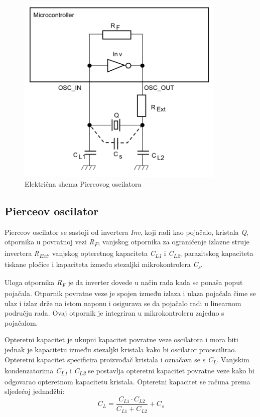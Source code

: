 \begin{figure}[hbt]
    \centering
    \includegraphics[width=10cm]{Figures/pierce.PNG}
    \caption{Električna shema Piercovog oscilatora \cite{stmicroelectronics:an2867}}
    \label{slk:PIERCE}
\end{figure}

\subsection{Pierceov oscilator}
Pierceov oscilator se sastoji od invertera \textit{Inv}, koji radi kao pojačalo, kristala \textit{Q}, otpornika u povratnoj vezi \textit{R\textsubscript{F}}, vanjskog otpornika za ograničenje izlazne struje invertera \textit{R\textsubscript{Ext}}, vanjskog opteretnog kapaciteta \textit{C\textsubscript{L1}} i \textit{C\textsubscript{L2}}, parazitskog kapaciteta tiskane pločice i kapaciteta između stezaljki mikrokontrolera \textit{C\textsubscript{s}}.

Uloga otpornika \textit{R\textsubscript{F}} je da inverter dovede u način rada kada se ponaša poput pojačala. Otpornik povratne veze je spojen između izlaza i ulaza pojačala čime se ulaz i izlaz drže na istom naponu i osigurava se da pojačalo radi u linearnom području rada. Ovaj otpornik je integriran u mikrokontroleru zajedno s pojačalom.

Opteretni kapacitet je ukupni kapacitet povratne veze oscilatora i mora biti jednak je kapacitetu između stezaljki kristala kako bi oscilator prooscilirao. Opteretni kapacitet specificira proizvođač kristala i označava se s \textit{C\textsubscript{L}}. Vanjskim kondenzatorima \textit{C\textsubscript{L1}} i \textit{C\textsubscript{L2}} se postavlja opteretni kapacitet povratne veze kako bi odgovarao opteretnom kapacitetu kristala. Opteretni kapacitet se računa prema sljedećoj jednadžbi:
\begin{equation} \label{eq:CLOAD}
    C_L=\frac{C_{L1}\cdot C_{L2}}{C_{L1}+C_{L2}}+C_s
\end{equation}

